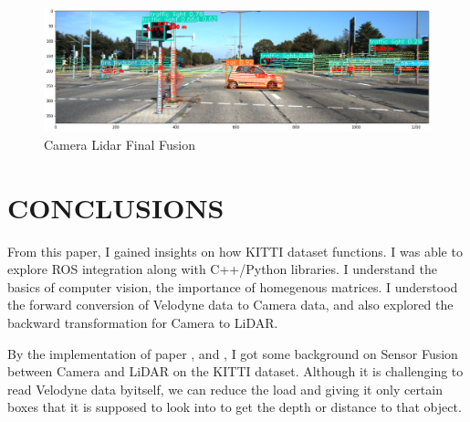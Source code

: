 \documentclass[letterpaper, 10 pt, conference]{ieeeconf}  %
\begin{document}
\begin{figure}[htbp]
  \centering
  \includegraphics[width=\linewidth]{CameraLidarFinalFusion.png}
  \caption{Camera Lidar Final Fusion}
  \label{Camera Lidar Final Fusion}
\end{figure}


\section{CONCLUSIONS}

From this paper, I gained insights on how KITTI dataset functions. I was able to explore ROS integration along with C++/Python libraries. I understand the basics of computer vision, the importance of homegenous matrices. I understood the forward conversion of Velodyne data to Camera data, and also explored the backward transformation for Camera to LiDAR.

By the implementation of paper \cite{KITTI}, \cite{CameraCalibration} and \cite{CoordinateTransforms}, I got some background on Sensor Fusion between Camera and LiDAR on the KITTI dataset. Although it is challenging to read Velodyne data byitself, we can reduce the load and giving it only certain boxes that it is supposed to look into to get the depth or distance to that object.



\addtolength{\textheight}{-12cm}   %




\end{document}
